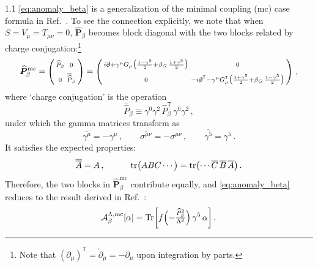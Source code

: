 \documentclass[a4paper,12pt]{article}
\def\Acal{{\cal A}}
\def\mat#1{\boldsymbol{#1}}
\def\T{\textsf{T}}
\def\X{\mat{\widehat{P}}}
\def\P{\widehat{P}}
\begin{document}
\begin{spacing}{1.1}
\cref{eq:anomaly_beta} is a generalization of the minimal coupling (mc) case formula in Ref.~\cite{Paper1}. To see the connection explicitly, we note that when $S = V_\mu = T_{\mu\nu}=0$, $\X_\beta$ becomes block diagonal with the two blocks related by charge conjugation:\footnote{Note that $(\partial_\mu)^\T = \overleftarrow{\partial}_\mu = -\partial_\mu$ upon integration by parts.}
\begin{equation}
\X_\beta^\text{mc}
= \left(\begin{smallmatrix} \P_\beta & 0 \\[4pt] 
0 & \overline{\P}_\beta \end{smallmatrix}\right) 
= \left(\begin{smallmatrix}
i\slashed{\partial} + \gamma^\mu G_\mu \bigl(\frac{1-\gamma^5}{2} + \beta_G\, \frac{1+\gamma^5}{2}\bigr) & 0 \\[4pt]
0 & -i\slashed{\partial}^\T -\gamma^\mu G_\mu^\T \bigl(\frac{1+\gamma^5}{2} + \beta_G\, \frac{1-\gamma^5}{2}\bigr)
\end{smallmatrix}\right) \,,
\end{equation}
where `charge conjugation' is the operation
\begin{equation}
\overline{\P}_\beta \equiv \gamma^0 \gamma^2\, \P_\beta^\T\, \gamma^0 \gamma^2 \,,
\end{equation}
under which the gamma matrices transform as
\begin{equation}
\overline{\gamma^\mu} = -\gamma^\mu \,,\qquad
\overline{\sigma^{\mu\nu}} = -\sigma^{\mu\nu} \,,\qquad
\overline{\gamma^5} = \gamma^5 \,.
\end{equation}
It satisfies the expected properties:
\begin{equation}
\overline{\overline{A}} = A \,,\qquad\quad
\tr \bigl( A B C \cdots \bigr) = \tr \bigl( \cdots \overline{C}\, \overline{B}\,\overline{A} \bigr) \,.
\label{eqn:CCProperties}
\end{equation}
Therefore, the two blocks in $\X_\beta^\text{mc}$ contribute equally, and \cref{eq:anomaly_beta} reduces to the result derived in Ref.~\cite{Paper1}:
\begin{equation}
\Acal_\beta^{\Lambda,\text{mc}}[\alpha] = \Tr \biggl[ f\Bigl(-\tfrac{\P_\beta^2}{\Lambda^2}\Bigr)\, \gamma^5\, \alpha \biggr] \,.
\end{equation}


\end{spacing}
\end{document}
